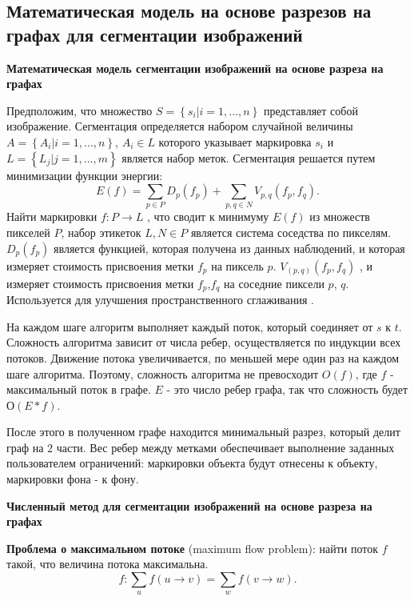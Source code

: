 \subsection{Математическая модель на основе разрезов на графах для сегментации изображений}
\textbf{Математическая модель сегментации изображений на основе разреза на графах}

Предположим, что множество $S=\left\{s_i|i=1, ..., n\right\}$ представляет собой изображение. Сегментация определяется набором случайной величины $A=\left\{A_i|i=1, ..., n\right\}$, $A_i\in L $ которого указывает маркировка $s_i$ и $L=\left\{L_j|j=1, ..., m\right\}$ является набор меток. Сегментация решается путем минимизации функции энергии:
\begin{equation}\label{eq25}
E\left(f\right) = \sum_{p \in P}D_p\left(f_p\right)+\sum_{p,q \in N}V_{p,q}\left(f_p,f_q\right).
\end{equation}
Найти маркировки $f:P\rightarrow L$ , что сводит к минимуму $E\left(f\right)$ из множеств пикселей $P$, набор этикеток $L,N \in P$ является система соседства по пикселям. $D_p\left(f_p\right)$ является функцией, которая получена из данных наблюдений, и которая измеряет стоимость присвоения метки $f_p$ на пиксель $p$. $V_{\left(p,q\right)} \left(f_p,f_q\right)$ , и измеряет стоимость присвоения метки $f_p$,$f_q$ на соседние пиксели $p$, $q$. Используется для улучшения пространственного сглаживания \cite{Boykovv2001, Boykov2004}.

На каждом шаге алгоритм выполняет каждый поток, который соединяет от $s$ к $t$. Сложность алгоритма зависит от числа ребер, осуществляется по индукции всех потоков. Движение потока увеличивается, по меньшей мере один раз на каждом шаге алгоритма. Поэтому, сложность алгоритма не превосходит $O\left(f\right)$, где  $f$ - максимальный поток в графе.  $E$ - это число ребер графа, так что сложность будет $О\left(E\ast f\right)$.

После этого в полученном графе находится минимальный разрез, который делит граф на $2$ части. Вес ребер между метками обеспечивает выполнение заданных пользователем ограничений: маркировки объекта будут отнесены к объекту, маркировки фона - к фону.

\textbf{Численный метод для сегментации изображений на основе разреза на графах}

\textbf{Проблема о максимальном потоке} (maximum flow problem): найти поток $f$ такой, что величина потока максимальна. 
\[
f: \sum_u f\left(u\rightarrow v\right)=\sum_wf\left(v\rightarrow w\right). 
\]

